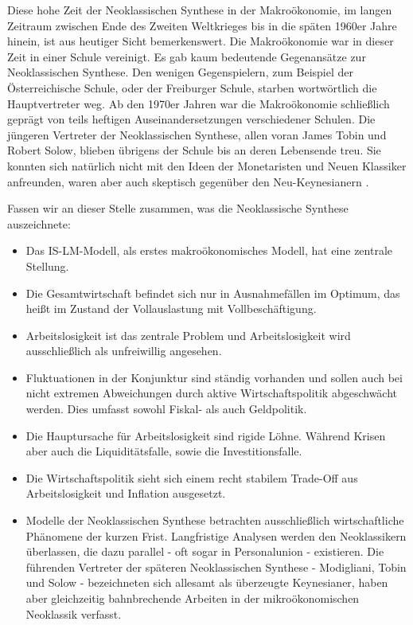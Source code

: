 Diese hohe Zeit der Neoklassischen Synthese in der Makroökonomie, im langen Zeitraum zwischen Ende des Zweiten Weltkrieges bis in die späten 1960er Jahre hinein, ist aus heutiger Sicht bemerkenswert. Die Makroökonomie war in dieser Zeit in einer Schule vereinigt. Es gab kaum bedeutende Gegenansätze zur Neoklassischen Synthese. Den wenigen Gegenspielern, zum Beispiel der Österreichische Schule, oder der Freiburger Schule, starben wortwörtlich die Hauptvertreter weg. Ab den 1970er Jahren war die Makroökonomie schließlich geprägt von teils heftigen Auseinandersetzungen verschiedener Schulen. Die jüngeren Vertreter der Neoklassischen Synthese, allen voran James Tobin und Robert Solow, blieben übrigens der Schule bis an deren Lebensende treu. Sie konnten sich natürlich nicht mit den Ideen der Monetaristen und Neuen Klassiker anfreunden, waren aber auch skeptisch gegenüber den Neu-Keynesianern \parencite[S. 148]{Snowdon2005}.

Fassen wir an dieser Stelle zusammen, was die Neoklassische Synthese auszeichnete:
\begin{itemize}
	\item Das IS-LM-Modell, als erstes makroökonomisches Modell, hat eine zentrale Stellung.
	\item Die Gesamtwirtschaft befindet sich nur in Ausnahmefällen im Optimum, das heißt im Zustand der Vollauslastung mit Vollbeschäftigung.
	\item Arbeitslosigkeit ist das zentrale Problem und Arbeitslosigkeit wird ausschließlich als unfreiwillig angesehen.
	\item Fluktuationen in der Konjunktur sind ständig vorhanden und sollen auch bei nicht extremen Abweichungen durch aktive Wirtschaftspolitik abgeschwächt werden. Dies umfasst sowohl Fiskal- als auch Geldpolitik.
	\item Die Hauptursache für Arbeitslosigkeit sind rigide Löhne. Während Krisen aber auch die Liquiditätsfalle, sowie die Investitionsfalle.
	\item Die Wirtschaftspolitik sieht sich einem recht stabilem Trade-Off aus Arbeitslosigkeit und Inflation ausgesetzt.
	\item Modelle der Neoklassischen Synthese betrachten ausschließlich wirtschaftliche Phänomene der kurzen Frist. Langfristige Analysen werden den Neoklassikern überlassen, die dazu parallel - oft sogar in Personalunion - existieren. Die führenden Vertreter der späteren Neoklassischen Synthese - Modigliani, Tobin und Solow - bezeichneten sich allesamt als überzeugte Keynesianer, haben aber gleichzeitig bahnbrechende Arbeiten in der mikroökonomischen Neoklassik verfasst.
\end{itemize}



